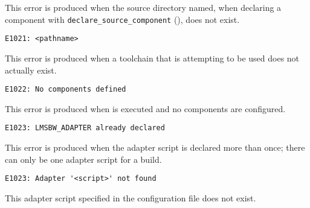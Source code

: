 This error is produced when the source directory named, when declaring
a component with \texttt{declare\_source\_component}
(), does not exist.


\begin{verbatim}
E1021: <pathname>
\end{verbatim}

This error is produced when a toolchain that is attempting to be used
does not actually exist.


\begin{verbatim}
E1022: No components defined
\end{verbatim}

This error is produced when \lmsbw is executed and no components are
configured.


\begin{verbatim}
E1023: LMSBW_ADAPTER already declared
\end{verbatim}

This error is produced when the  \lmsbw adapter script is declared
more than once; there can only be one adapter script for a build.


\begin{verbatim}
E1023: Adapter '<script>' not found
\end{verbatim}

This adapter script specified in the configuration file does not exist.
